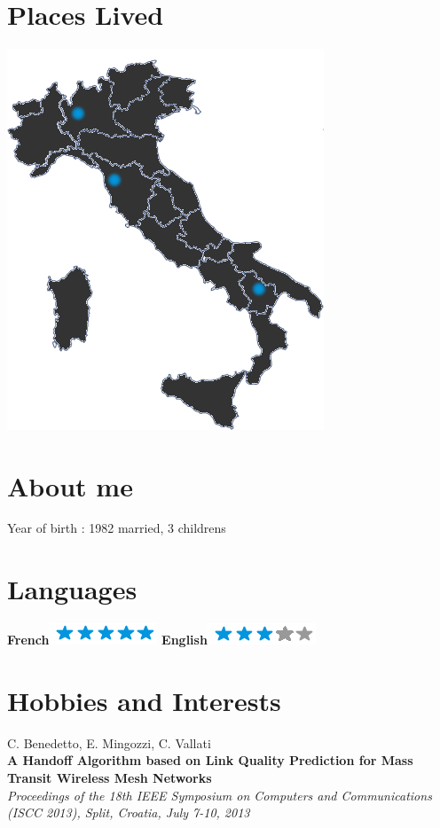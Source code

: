 \documentclass[]{friggeri-cv}
\begin{document}
\begin{aside}
~
~
~
  \section{Places Lived}
    \includegraphics[scale=0.25]{img/italia.png}
    ~
  \section{About me}
    Year of birth : 1982
    married, 3 childrens 
    ~
  \section{Languages}
    \textbf{French}\includegraphics[scale=0.40]{img/5stars.png}
    \textbf{English}\includegraphics[scale=0.40]{img/3stars.png}
\end{aside}

\section{Hobbies and Interests}
C. Benedetto, E. Mingozzi, C. Vallati\\
\textbf{A Handoff Algorithm based on Link Quality Prediction for Mass Transit Wireless Mesh Networks}\\
\emph{Proceedings of the 18th IEEE Symposium on Computers and Communications (ISCC 2013), Split, Croatia, July 7-10, 2013}
\\
\end{document}
